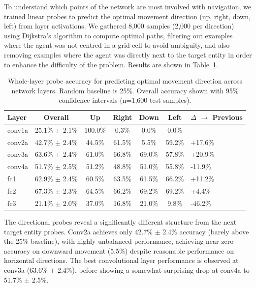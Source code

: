 To understand which points of the network are most involved with navigation, we trained linear probes to predict the optimal movement direction (up, right, down, left) from layer activations. We gathered 8,000 samples (2,000 per direction) using Dijkstra's algorithm to compute optimal paths, filtering out examples where the agent was not centred in a grid cell to avoid ambiguity, and also removing examples where the agent was directly next to the target entity in order to enhance the difficulty of the problem. Results are shown in Table~\ref{tab:probe_directional}.

\begin{table}[h]
    \centering
    \caption[Whole-layer directional probe accuracy by layer]{Whole-layer probe accuracy for predicting optimal movement direction across network layers. Random baseline is 25\%. Overall accuracy shown with 95\% confidence intervals (n=1,600 test samples).}
    \label{tab:probe_directional}
    \begin{tabular}{lcccccl}
    \toprule
    \textbf{Layer} & \textbf{Overall} & \textbf{Up} & \textbf{Right} & \textbf{Down} & \textbf{Left} & \textbf{$\Delta$ $\rightarrow$ Previous} \\
    \midrule
    conv1a & 25.1\% $\pm$ 2.1\% & 100.0\% & 0.3\% & 0.0\% & 0.0\% & --- \\
    conv2a & 42.7\% $\pm$ 2.4\% & 44.5\% & 61.5\% & 5.5\% & 59.2\% & +17.6\% \\
    conv3a & 63.6\% $\pm$ 2.4\% & 61.0\% & 66.8\% & 69.0\% & 57.8\% & +20.9\% \\
    conv4a & 51.7\% $\pm$ 2.5\% & 51.2\% & 48.8\% & 51.0\% & 55.8\% & -11.9\% \\
    \midrule
    fc1 & 62.9\% $\pm$ 2.4\% & 60.5\% & 63.5\% & 61.5\% & 66.2\% & +11.2\% \\
    fc2 & 67.3\% $\pm$ 2.3\% & 64.5\% & 66.2\% & 69.2\% & 69.2\% & +4.4\% \\
    fc3 & 21.1\% $\pm$ 2.0\% & 37.0\% & 16.8\% & 21.0\% & 9.8\% & -46.2\% \\
    \bottomrule
    \end{tabular}
\end{table}

The directional probes reveal a significantly different structure from the next target entity probes. Conv2a achieves only 42.7\% $\pm$ 2.4\% accuracy (barely above the 25\% baseline), with highly unbalanced performance, achieving near-zero accuracy on downward movement (5.5\%) despite reasonable performance on horizontal directions. The best convolutional layer performance is observed at conv3a (63.6\% $\pm$ 2.4\%), before showing a somewhat surprising drop at conv4a to 51.7\% $\pm$ 2.5\%. 

